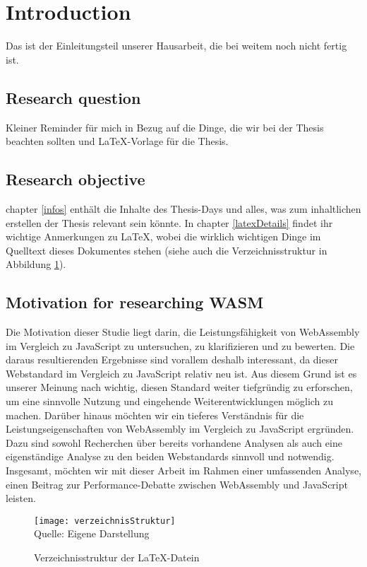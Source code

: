 \section{Introduction}
Das ist der Einleitungsteil unserer Hausarbeit, die bei weitem noch nicht fertig ist.

\subsection{Research question}
Kleiner Reminder für mich in Bezug auf die Dinge, die wir bei der Thesis beachten sollten und \LaTeX{}-Vorlage für die Thesis.

\subsection{Research objective}
chapter \ref{infos} enthält die Inhalte des Thesis-Days und alles, was zum inhaltlichen erstellen der Thesis relevant sein könnte. In chapter \ref{latexDetails}  findet ihr wichtige Anmerkungen zu \LaTeX{}, wobei die wirklich wichtigen Dinge im Quelltext dieses Dokumentes stehen (siehe auch die Verzeichnisstruktur in Abbildung \ref{fig:verzeichnisStruktur}).

\subsection{Motivation for researching WASM}
Die Motivation dieser Studie liegt darin, die Leistungsfähigkeit von WebAssembly im Vergleich zu JavaScript zu untersuchen, zu klarifizieren und zu bewerten. Die daraus resultierenden Ergebnisse sind vorallem deshalb interessant, da dieser Webstandard im Vergleich zu JavaScript relativ neu ist.
Aus diesem Grund ist es unserer Meinung nach wichtig, diesen Standard weiter tiefgründig zu erforschen, um eine sinnvolle Nutzung und eingehende Weiterentwicklungen möglich zu machen. Darüber hinaus möchten wir ein tieferes Verständnis für die Leistungseigenschaften von WebAssembly im Vergleich zu JavaScript ergründen. Dazu sind sowohl Recherchen über bereits vorhandene Analysen als auch eine eigenständige Analyse zu den beiden Webstandards sinnvoll und notwendig.
Insgesamt, möchten wir mit dieser Arbeit im Rahmen einer umfassenden Analyse, einen Beitrag zur Performance-Debatte zwischen WebAssembly und JavaScript leisten.

\begin{figure}[H]
\caption{Verzeichnisstruktur der \LaTeX{}-Datein}\label{fig:verzeichnisStruktur}
\texttt{[image: verzeichnisStruktur]}
\\
Quelle: Eigene Darstellung
\end{figure}
